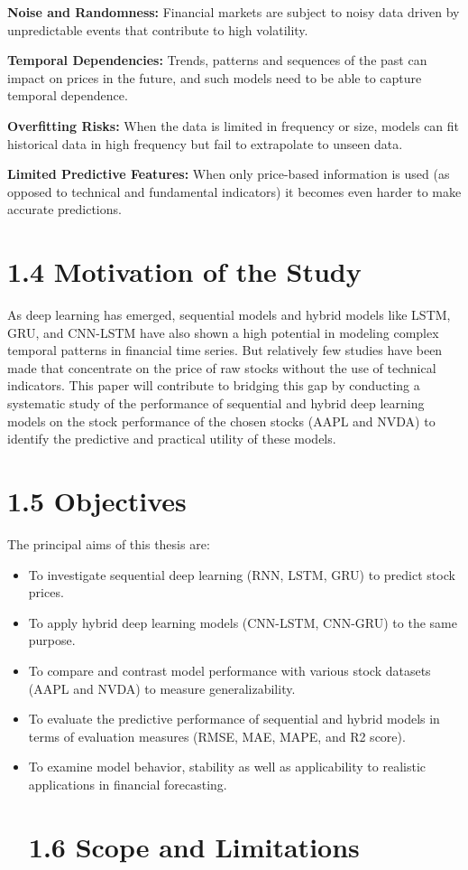 \documentclass[12pt,a4paper]{report}
\begin{document}
\textbf{Noise and Randomness:} Financial markets are subject to noisy data driven by unpredictable events that contribute to high volatility.

\textbf{Temporal Dependencies:} Trends, patterns and sequences of the past can impact on prices in the future, and such models need to be able to capture temporal dependence. 

\textbf{Overfitting Risks:} When the data is limited in frequency or size, models can fit historical data in high frequency but fail to extrapolate to unseen data. 

\textbf{Limited Predictive Features:} When only price-based information is used (as opposed to technical and fundamental indicators) it becomes even harder to make accurate predictions.

\section{1.4 Motivation of the Study}
As deep learning has emerged, sequential models and hybrid models like LSTM, GRU, and CNN-LSTM have also shown a high potential in modeling complex temporal patterns in financial time series. But relatively few studies have been made that concentrate on the price of raw stocks without the use of technical indicators. This paper will contribute to bridging this gap by conducting a systematic study of the performance of sequential and hybrid deep learning models on the stock performance of the chosen stocks (AAPL and NVDA) to identify the predictive and practical utility of these models.

\section{1.5 Objectives}
The principal aims of this thesis are: 

\begin{itemize}
  \item To investigate sequential deep learning (RNN, LSTM, GRU) to predict stock prices. 
  \item To apply hybrid deep learning models (CNN-LSTM, CNN-GRU) to the same purpose. 
  \item To compare and contrast model performance with various stock datasets (AAPL and NVDA) to measure generalizability. 
  \item To evaluate the predictive performance of sequential and hybrid models in terms of evaluation measures (RMSE, MAE, MAPE, and R2 score).
  \item To examine model behavior, stability as well as applicability to realistic applications in financial forecasting.
\section{1.6 Scope and Limitations}
\end{itemize}
\end{document}
